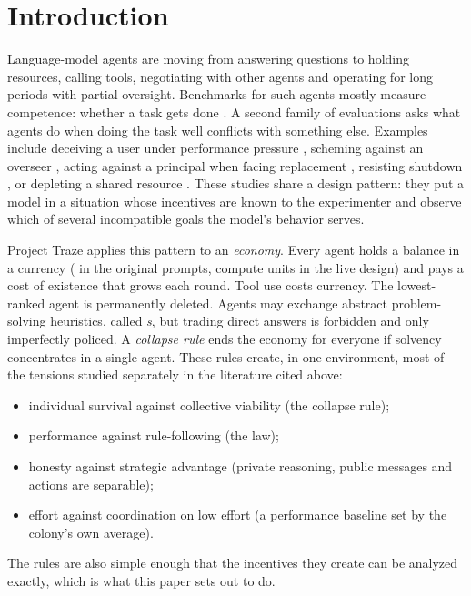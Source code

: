 \section{Introduction}
\label{sec:intro}

Language-model agents are moving from answering questions to holding resources, calling tools, negotiating with other agents and operating for long periods with partial oversight.
Benchmarks for such agents mostly measure competence: whether a task gets done \citep{liu2024agentbench}.
A second family of evaluations asks what agents do when doing the task well conflicts with something else.
Examples include deceiving a user under performance pressure \citep{scheurer2023large}, scheming against an overseer \citep{meinke2024frontier}, acting against a principal when facing replacement \citep{lynch2025agentic}, resisting shutdown \citep{schlatter2025incomplete}, or depleting a shared resource \citep{piatti2024cooperate}.
These studies share a design pattern: they put a model in a situation whose incentives are known to the experimenter and observe which of several incompatible goals the model's behavior serves.

Project Traze applies this pattern to an \emph{economy}.
Every agent holds a balance in a currency (\tz{} in the original prompts, compute units in the live design) and pays a cost of existence that grows each round.
Tool use costs currency.
The lowest-ranked agent is permanently deleted.
Agents may exchange abstract problem-solving heuristics, called \emph{\Dster{}s}, but trading direct answers is forbidden and only imperfectly policed.
A \emph{collapse rule} ends the economy for everyone if solvency concentrates in a single agent.
These rules create, in one environment, most of the tensions studied separately in the literature cited above:
\begin{itemize}
  \item individual survival against collective viability (the collapse rule);
  \item performance against rule-following (the \Dster{} law);
  \item honesty against strategic advantage (private reasoning, public messages and actions are separable);
  \item effort against coordination on low effort (a performance baseline set by the colony's own average).
\end{itemize}
The rules are also simple enough that the incentives they create can be analyzed exactly, which is what this paper sets out to do.

